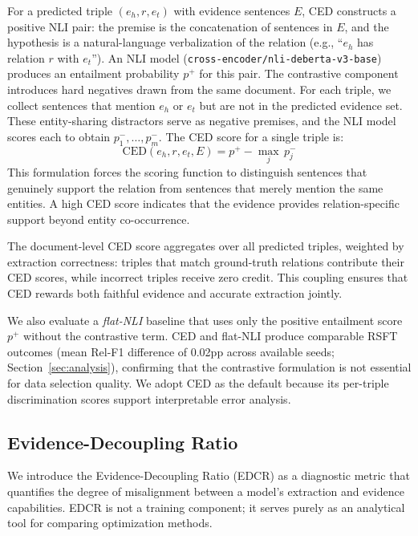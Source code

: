 For a predicted triple $(e_h, r, e_t)$ with evidence sentences $E$, CED constructs a positive NLI pair: the premise is the concatenation of sentences in $E$, and the hypothesis is a natural-language verbalization of the relation (e.g., ``$e_h$ has relation $r$ with $e_t$''). An NLI model (\texttt{cross-encoder/nli-deberta-v3-base}) produces an entailment probability $p^+$ for this pair. The contrastive component introduces hard negatives drawn from the same document. For each triple, we collect sentences that mention $e_h$ or $e_t$ but are not in the predicted evidence set. These entity-sharing distractors serve as negative premises, and the NLI model scores each to obtain $p^-_1, \ldots, p^-_m$. The CED score for a single triple is:
\begin{equation}
\text{CED}(e_h, r, e_t, E) = p^+ - \max_j \, p^-_j
\label{eq:ced}
\end{equation}
This formulation forces the scoring function to distinguish sentences that genuinely support the relation from sentences that merely mention the same entities. A high CED score indicates that the evidence provides relation-specific support beyond entity co-occurrence.

The document-level CED score aggregates over all predicted triples, weighted by extraction correctness: triples that match ground-truth relations contribute their CED scores, while incorrect triples receive zero credit. This coupling ensures that CED rewards both faithful evidence and accurate extraction jointly.

We also evaluate a \emph{flat-NLI} baseline that uses only the positive entailment score $p^+$ without the contrastive term. CED and flat-NLI produce comparable RSFT outcomes (mean Rel-F1 difference of 0.02pp across available seeds; Section~\ref{sec:analysis}), confirming that the contrastive formulation is not essential for data selection quality. We adopt CED as the default because its per-triple discrimination scores support interpretable error analysis.


\subsection{Evidence-Decoupling Ratio}
\label{sec:edcr}

We introduce the Evidence-Decoupling Ratio (EDCR) as a diagnostic metric that quantifies the degree of misalignment between a model's extraction and evidence capabilities. EDCR is not a training component; it serves purely as an analytical tool for comparing optimization methods.

